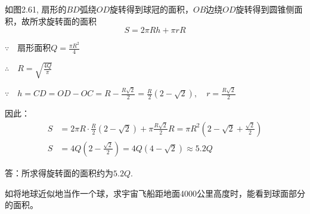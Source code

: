 \begin{solution}
    如图2.61, 扇形的$BD$弧绕$OD$旋转得到球冠的面积，$OB$边绕$OD$旋转得到圆锥侧面积，故所求旋转面的面积
\[S=2\pi Rh+\pi rR\]

$\because\quad \text{扇形面积}Q=\frac{\pi R^2}{4}$

$\therefore\quad R=\sqrt{\frac{4Q}{\pi}}$

$\because\quad h=CD=OD-OC=R-\frac{R\sqrt{2}}{2}=\frac{R}{2}(2-\sqrt{2}),\quad r=\frac{R\sqrt{2}}{2}$

因此：
\[\begin{split}
    S&=2\pi R\cdot \frac{R}{2}\left(2-\sqrt{2}\right)+\pi\frac{R\sqrt{2}}{2}R=\pi R^2\left(2-\sqrt{2}+\frac{\sqrt{2}}{2}\right)\\
    S&=4Q\left(2-\frac{\sqrt{2}}{2}\right)=4Q\left(4-\sqrt{2}\right)\approx 5.2Q
\end{split}\]

答：所求得旋转面的面积约为$5.2Q$.
\end{solution}


  \begin{example}
    如将地球近似地当作一个球，求宇宙飞船距地面4000公里高度时，能看到球面部分的面积。
  \end{example}

\begin{figure}[htp]
    \centering
{}
    \caption{}
\end{figure}

